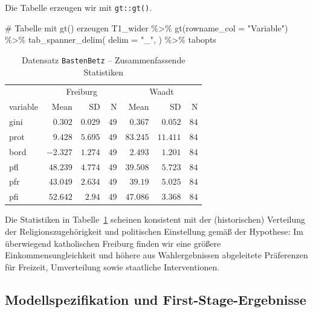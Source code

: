 \documentclass[
  a4paper,
  DIV=11,
  oneside]{scrreprt}
\newenvironment{Shaded}{\begin{snugshade}}{\end{snugshade}}
\newcommand{\AttributeTok}[1]{\textcolor[rgb]{0.40,0.45,0.13}{#1}}
\newcommand{\CommentTok}[1]{\textcolor[rgb]{0.37,0.37,0.37}{#1}}
\newcommand{\FunctionTok}[1]{\textcolor[rgb]{0.28,0.35,0.67}{#1}}
\newcommand{\NormalTok}[1]{\textcolor[rgb]{0.00,0.23,0.31}{#1}}
\newcommand{\SpecialCharTok}[1]{\textcolor[rgb]{0.37,0.37,0.37}{#1}}
\newcommand{\StringTok}[1]{\textcolor[rgb]{0.13,0.47,0.30}{#1}}
\begin{document}
Die Tabelle erzeugen wir mit \texttt{gt::gt()}.

\begin{Shaded}
\begin{Highlighting}[]
\CommentTok{\# Tabelle mit gt() erzeugen}
\NormalTok{T1\_wider }\SpecialCharTok{\%\textgreater{}\%}
  \FunctionTok{gt}\NormalTok{(}\AttributeTok{rowname\_col =} \StringTok{"Variable"}\NormalTok{) }\SpecialCharTok{\%\textgreater{}\%} 
  \FunctionTok{tab\_spanner\_delim}\NormalTok{(}
    \AttributeTok{delim =} \StringTok{"\_"}\NormalTok{,}
\NormalTok{  ) }\SpecialCharTok{\%\textgreater{}\%}
\NormalTok{ tabopts}
\end{Highlighting}
\end{Shaded}

\hypertarget{tbl-sumstat}{}
\begin{longtable}{lrrrrrr}
\caption{\label{tbl-sumstat}Datensatz \texttt{BastenBetz} -- Zusammenfassende Statistiken }\tabularnewline

\toprule
 & \multicolumn{3}{c}{Freiburg} & \multicolumn{3}{c}{Waadt} \\ 
\cmidrule(lr){2-4} \cmidrule(lr){5-7}
variable & Mean & SD & N & Mean & SD & N \\ 
\midrule\addlinespace[2.5pt]
gini & $0.302$ & $0.029$ & $49$ & $0.367$ & $0.052$ & $84$ \\ 
prot & $9.428$ & $5.695$ & $49$ & $83.245$ & $11.411$ & $84$ \\ 
bord & $-2.327$ & $1.274$ & $49$ & $2.493$ & $1.201$ & $84$ \\ 
pfl & $48.239$ & $4.774$ & $49$ & $39.508$ & $5.723$ & $84$ \\ 
pfr & $43.049$ & $2.634$ & $49$ & $39.19$ & $5.025$ & $84$ \\ 
pfi & $52.642$ & $2.94$ & $49$ & $47.086$ & $3.368$ & $84$ \\ 
\bottomrule
\end{longtable}

Die Statistiken in Tabelle~\ref{tbl-sumstat} scheinen konsistent mit der
(historischen) Verteilung der Religionszugehörigkeit und politischen
Einstellung gemäß der Hypothese: Im überwiegend katholischen Freiburg
finden wir eine größere Einkommensungleichkeit und höhere aus
Wahlergebnissen abgeleitete Präferenzen für Freizeit, Umverteilung sowie
staatliche Interventionen.

\hypertarget{modellspezifikation-und-first-stage-ergebnisse}{%
\subsection{Modellspezifikation und
First-Stage-Ergebnisse}\label{modellspezifikation-und-first-stage-ergebnisse}}
\end{document}
